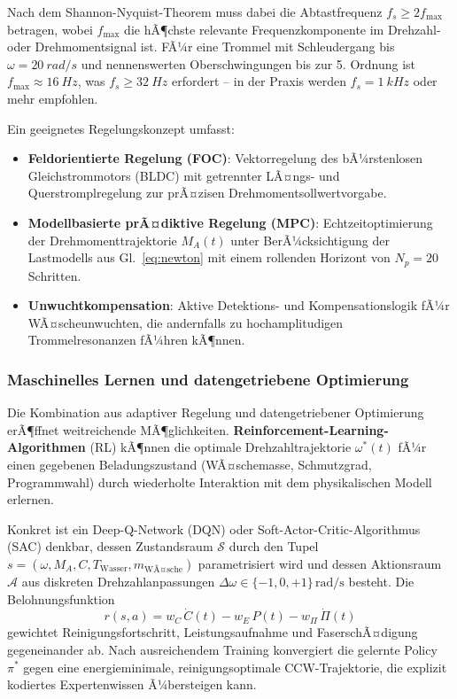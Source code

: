 ﻿\documentclass[12pt,a4paper]{article}
\theoremstyle{remark}
\begin{document}
	Nach dem Shannon-Nyquist-Theorem \cite{epp2026digi} muss dabei die Abtastfrequenz
	$f_s \geq 2f_{\max}$ betragen, wobei $f_{\max}$ die hÃ¶chste relevante
	Frequenzkomponente im Drehzahl- oder Drehmomentsignal ist. FÃ¼r eine Trommel mit
	Schleudergang bis $\omega = \SI{20}{rad/s}$ und nennenswerten Oberschwingungen bis zur
	5. Ordnung ist $f_{\max} \approx \SI{16}{Hz}$, was $f_s \geq \SI{32}{Hz}$ erfordert --
	in der Praxis werden $f_s = \SI{1}{kHz}$ oder mehr empfohlen.
	
	Ein geeignetes Regelungskonzept umfasst:
	\begin{itemize}
		\item \textbf{Feldorientierte Regelung (FOC)}: Vektorregelung des bÃ¼rstenlosen
		Gleichstrommotors (BLDC) mit getrennter LÃ¤ngs- und Querstromplregelung zur
		prÃ¤zisen Drehmomentsollwertvorgabe.
		\item \textbf{Modellbasierte prÃ¤diktive Regelung (MPC)}: Echtzeitoptimierung der
		Drehmomenttrajektorie $M_A(t)$ unter BerÃ¼cksichtigung der Lastmodells
		aus Gl.~\eqref{eq:newton} mit einem rollenden Horizont von $N_p = 20$ Schritten.
		\item \textbf{Unwuchtkompensation}: Aktive Detektions- und Kompensationslogik fÃ¼r
		WÃ¤sche\-unwuchten, die andernfalls zu hochamplitudigen Trommelresonanzen fÃ¼hren kÃ¶nnen.
	\end{itemize}
	
	\subsubsection{Maschinelles Lernen und datengetriebene Optimierung}
	
	Die Kombination aus adaptiver Regelung und datengetriebener Optimierung erÃ¶ffnet
	weitreichende MÃ¶glichkeiten. \textbf{Reinforcement-Learning-Algorithmen} (RL) kÃ¶nnen
	die optimale Drehzahltrajektorie $\omega^*(t)$ fÃ¼r einen gegebenen Beladungszustand
	(WÃ¤schemasse, Schmutzgrad, Programmwahl) durch wiederholte Interaktion mit dem
	physikalischen Modell erlernen.
	
	Konkret ist ein Deep-Q-Network (DQN) oder Soft-Actor-Critic-Algorithmus (SAC) denkbar,
	dessen Zustandsraum $\mathcal{S}$ durch den Tupel
	$s = (\omega, M_A, C, T_{\mathrm{Wasser}}, m_{\mathrm{WÃ¤sche}})$
	parametrisiert wird und dessen Aktionsraum $\mathcal{A}$ aus diskreten
	Drehzahlanpassungen $\Delta\omega \in \{-1, 0, +1\}\,\mathrm{rad/s}$ besteht.
	Die Belohnungsfunktion
	\begin{equation}
		r(s,a) = w_C\,\dot{C}(t) - w_E\,P(t) - w_\Pi\,\dot{\Pi}(t)
	\end{equation}
	gewichtet Reinigungsfortschritt, Leistungsaufnahme und FaserschÃ¤digung gegeneinander
	ab. Nach ausreichendem Training konvergiert die gelernte Policy $\pi^*$ gegen eine
	energieminimale, reinigungsoptimale CCW-Trajektorie, die explizit kodiertes
	Expertenwissen Ã¼bersteigen kann.
	
\end{document}
